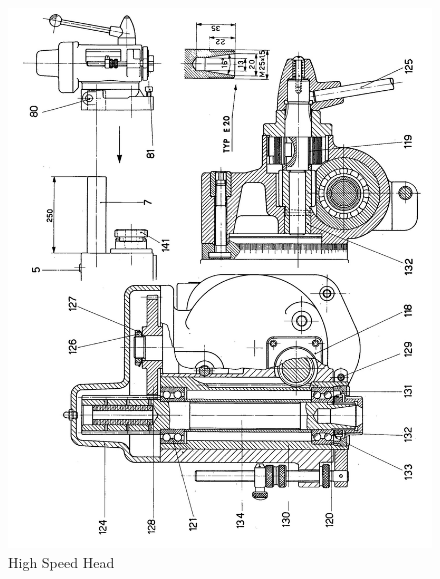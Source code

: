 \newpage
\begin{figure}[h]
    \centering
    \includegraphics[width=1.0\linewidth]{./images/page_41}
    \caption{High Speed Head}
    \label{fig:high_speed_head}
\end{figure}
